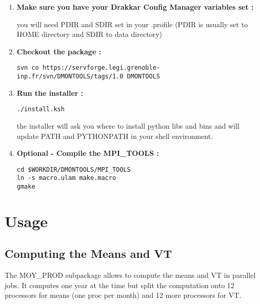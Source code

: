 \documentclass[a4paper,11pt]{article}
\begin{document}
\begin{enumerate}

\item \textbf{Make sure you have your Drakkar Config Manager variables set :}

you will need PDIR and SDIR set in your .profile (PDIR is usually set to HOME directory and
SDIR to data directory)

\item \textbf{Checkout the package :}

\begin{verbatim}
svn co https://servforge.legi.grenoble-inp.fr/svn/DMONTOOLS/tags/1.0 DMONTOOLS
\end{verbatim}

\item \textbf{Run the installer :}

\begin{verbatim}
./install.ksh
\end{verbatim}

\noindent
the installer will ask you where to install python libs and bins
and will update PATH and PYTHONPATH in your shell environment.

\item \textbf{Optional - Compile the MPI\_TOOLS :}

\begin{verbatim}
cd $WORKDIR/DMONTOOLS/MPI_TOOLS
ln -s macro.ulam make.macro
gmake
\end{verbatim}

\end{enumerate}

\clearpage
\newpage

\section{Usage}

\subsection{Computing the Means and VT}

The MOY\_PROD subpackage allows to compute the means and VT in parallel jobs. It computes one year
at the time but split the computation onto 12 processors for means (one proc per month) and 12 more
processors for VT.
\\[0.2cm]
\par
\end{document}

